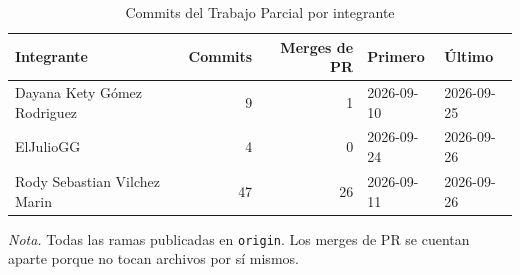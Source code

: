\begin{table}[H]
\caption{Commits del Trabajo Parcial por integrante}\label{tab:commits-autor}
\small
\begin{tabular}{@{}lrrll@{}}
\toprule
\textbf{Integrante} & \textbf{Commits} & \textbf{Merges de PR} & \textbf{Primero} & \textbf{Último} \\
\midrule
Dayana Kety Gómez Rodriguez & 9 & 1 & 2026-09-10 & 2026-09-25 \\
ElJulioGG & 4 & 0 & 2026-09-24 & 2026-09-26 \\
Rody Sebastian Vilchez Marin & 47 & 26 & 2026-09-11 & 2026-09-26 \\
\bottomrule
\end{tabular}

{\footnotesize\textit{Nota.} Todas las ramas publicadas en \texttt{origin}. Los merges de PR se cuentan aparte porque no tocan archivos por sí mismos.\par}
\end{table}

